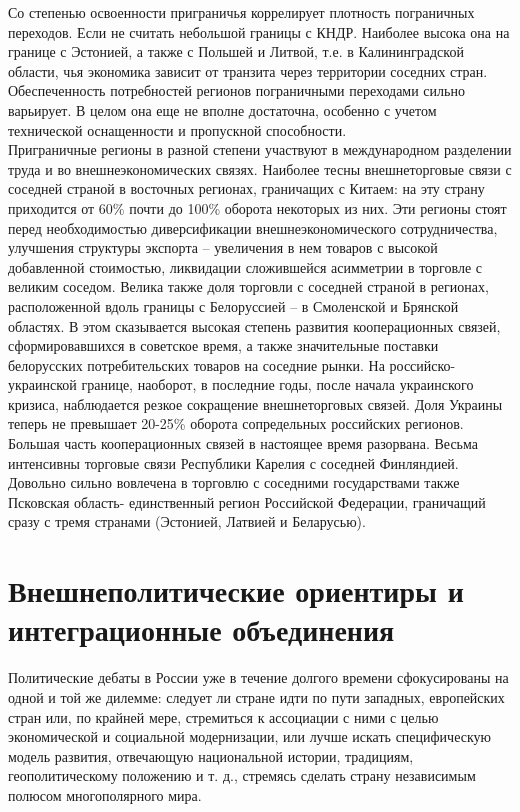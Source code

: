 \documentclass[]{book}
\begin{document}
Со степенью освоенности приграничья коррелирует плотность пограничных
переходов. Если не считать небольшой границы с КНДР. Наиболее высока она
на границе с Эстонией, а также с Польшей и Литвой, т.е. в
Калининградской области, чья экономика зависит от транзита через
территории соседних стран. Обеспеченность потребностей регионов
пограничными переходами сильно варьирует. В целом она еще не вполне
достаточна, особенно с учетом технической оснащенности и пропускной
способности.\\
Приграничные регионы в разной степени участвуют в международном
разделении труда и во внешнеэкономических связях. Наиболее тесны
внешнеторговые связи с соседней страной в восточных регионах, граничащих
с Китаем: на эту страну приходится от 60\% почти до 100\% оборота
некоторых из них. Эти регионы стоят перед необходимостью диверсификации
внешнеэкономического сотрудничества, улучшения структуры экспорта --
увеличения в нем товаров с высокой добавленной стоимостью, ликвидации
сложившейся асимметрии в торговле с великим соседом. Велика также доля
торговли с соседней страной в регионах, расположенной вдоль границы с
Белоруссией -- в Смоленской и Брянской областях. В этом сказывается
высокая степень развития кооперационных связей, сформировавшихся в
советское время, а также значительные поставки белорусских
потребительских товаров на соседние рынки. На российско-украинской
границе, наоборот, в последние годы, после начала украинского кризиса,
наблюдается резкое сокращение внешнеторговых связей. Доля Украины теперь
не превышает 20-25\% оборота сопредельных российских регионов. Большая
часть кооперационных связей в настоящее время разорвана. Весьма
интенсивны торговые связи Республики Карелия с соседней Финляндией.
Довольно сильно вовлечена в торговлю с соседними государствами также
Псковская область- единственный регион Российской Федерации, граничащий
сразу с тремя странами (Эстонией, Латвией и Беларусью).

\section{Внешнеполитические ориентиры и интеграционные
объединения}\label{geopol-foreign}

Политические дебаты в России уже в течение долгого времени сфокусированы
на одной и той же дилемме: следует ли стране идти по пути западных,
европейских стран или, по крайней мере, стремиться к ассоциации с ними с
целью экономической и социальной модернизации, или лучше искать
специфическую модель развития, отвечающую национальной истории,
традициям, геополитическому положению и т. д., стремясь сделать страну
независимым полюсом многополярного мира.
\end{document}
